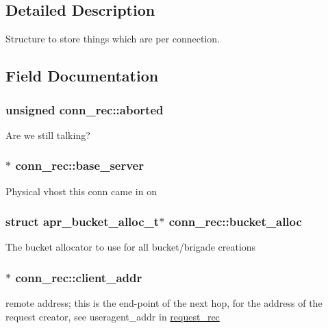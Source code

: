 \subsection{Detailed Description}
Structure to store things which are per connection. 

\subsection{Field Documentation}
\subsubsection[{\texorpdfstring{aborted}{aborted}}]{\setlength{\rightskip}{0pt plus 5cm}unsigned conn\+\_\+rec\+::aborted}\hypertarget{structconn__rec_aead9e56515e09e4f4b32a543e988e123}{}\label{structconn__rec_aead9e56515e09e4f4b32a543e988e123}
Are we still talking? 
\subsubsection[{\texorpdfstring{base\+\_\+server}{base_server}}]{$\ast$ conn\+\_\+rec\+::base\+\_\+server}\hypertarget{structconn__rec_a1e199eb6e4e1617e94dd03b9cfaa83c8}{}\label{structconn__rec_a1e199eb6e4e1617e94dd03b9cfaa83c8}
Physical vhost this conn came in on 
\subsubsection[{\texorpdfstring{bucket\+\_\+alloc}{bucket_alloc}}]{\setlength{\rightskip}{0pt plus 5cm}struct {\bf apr\+\_\+bucket\+\_\+alloc\+\_\+t}$\ast$ conn\+\_\+rec\+::bucket\+\_\+alloc}\hypertarget{structconn__rec_a5a9ee4911c5a655131f76a04036fb4c0}{}\label{structconn__rec_a5a9ee4911c5a655131f76a04036fb4c0}
The bucket allocator to use for all bucket/brigade creations 
\subsubsection[{\texorpdfstring{client\+\_\+addr}{client_addr}}]{$\ast$ conn\+\_\+rec\+::client\+\_\+addr}\hypertarget{structconn__rec_a182fbb82669057b3ddafaf9e3075a745}{}\label{structconn__rec_a182fbb82669057b3ddafaf9e3075a745}
remote address; this is the end-\/point of the next hop, for the address of the request creator, see useragent\+\_\+addr in \hyperlink{structrequest__rec}{request\+\_\+rec} 
